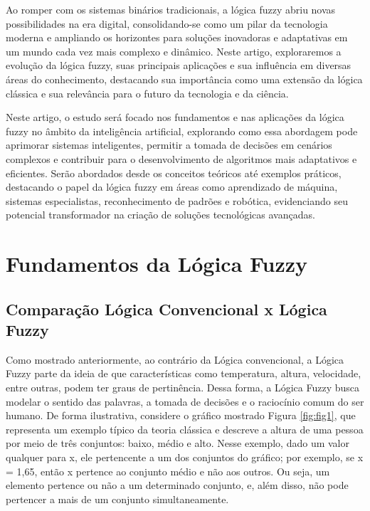 \documentclass[12pt]{article}
\begin{document}
Ao romper com os sistemas binários tradicionais, a lógica fuzzy abriu novas possibilidades na era digital, consolidando-se como um pilar da tecnologia moderna e ampliando os horizontes para soluções inovadoras e adaptativas em um mundo cada vez mais complexo e dinâmico. Neste artigo, exploraremos a evolução da lógica fuzzy, suas principais aplicações e sua influência em diversas áreas do conhecimento, destacando sua importância como uma extensão da lógica clássica e sua relevância para o futuro da tecnologia e da ciência.

Neste artigo, o estudo será focado nos fundamentos e nas aplicações da lógica fuzzy no âmbito da inteligência artificial, explorando como essa abordagem pode aprimorar sistemas inteligentes, permitir a tomada de decisões em cenários complexos e contribuir para o desenvolvimento de algoritmos mais adaptativos e eficientes. Serão abordados desde os conceitos teóricos até exemplos práticos, destacando o papel da lógica fuzzy em áreas como aprendizado de máquina, sistemas especialistas, reconhecimento de padrões e robótica, evidenciando seu potencial transformador na criação de soluções tecnológicas avançadas.

\section{Fundamentos da Lógica Fuzzy}

\subsection{Comparação Lógica Convencional x Lógica Fuzzy}

Como mostrado anteriormente, ao contrário da Lógica convencional, a Lógica Fuzzy parte da ideia de que características como temperatura, altura, velocidade, entre outras, podem ter graus de pertinência. Dessa forma, a Lógica Fuzzy busca modelar o sentido das palavras, a tomada de decisões e o raciocínio comum do ser humano. De forma ilustrativa, considere o gráfico mostrado Figura \ref{fig:fig1}, que representa um exemplo típico da teoria clássica e descreve a altura de uma pessoa por meio de três conjuntos: baixo, médio e alto. Nesse exemplo, dado um valor qualquer para x, ele pertencente a um dos conjuntos do gráfico; por exemplo, se x = 1,65, então x pertence ao conjunto médio e não aos outros. Ou seja, um elemento pertence ou não a um determinado conjunto, e, além disso, não pode pertencer a mais de um conjunto simultaneamente.
\end{document}
